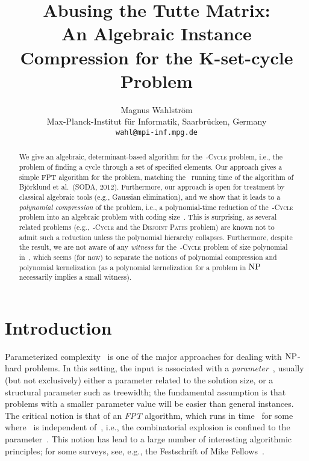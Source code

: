 \documentclass[a4paper,11pt]{article}
\title{Abusing the Tutte Matrix: \\An Algebraic Instance Compression for the K-set-cycle Problem}
\author{Magnus Wahlstr\"om\\
Max-Planck-Institut f\"ur Informatik,
Saarbr\"ucken, Germany \\
\texttt{wahl@mpi-inf.mpg.de}}
\newcommand{\cclass}[1]{\ensuremath{\mbox{\textup{#1}}}\xspace}
\newcommand{\NP}{\cclass{NP}}
\begin{document}
\maketitle

\begin{abstract}
We give an algebraic, determinant-based algorithm for the~\textsc{-Cycle} problem,
i.e., the problem of finding a cycle through a set of specified elements. Our approach
gives a simple FPT algorithm for the problem, matching the~ running time
of the algorithm of Bj\"orklund et al.~(SODA, 2012). Furthermore, our approach is open for
treatment by classical algebraic tools (e.g., Gaussian elimination), and we show that it
leads to a \emph{polynomial compression} of the problem, i.e., a polynomial-time reduction
of the~\textsc{-Cycle} problem into an algebraic problem with coding size~.
This is surprising, as several related problems (e.g.,~\textsc{-Cycle} and the
\textsc{Disjoint Paths} problem) are known not to admit such a reduction unless the
polynomial hierarchy collapses. Furthermore, despite the result, we are not aware of
any \emph{witness} for the~\textsc{-Cycle} problem of size polynomial in~,
which seems (for now) to separate the notions of polynomial compression and polynomial
kernelization (as a polynomial kernelization for a problem in \NP necessarily implies a
small witness). 
\end{abstract}

\section{Introduction}

Parameterized complexity~\cite{DowneyF98,FlumG06} is one of the major approaches for
dealing with \NP-hard problems. In this setting, the input is associated with a
\emph{parameter}~, usually (but not exclusively) either a parameter related to the
solution size, or a structural parameter such as treewidth; the fundamental assumption is that
problems with a smaller parameter value will be easier than general instances. 
The critical notion is that of an \emph{FPT} algorithm, which runs in time~
for some~ where~ is independent of~, i.e., the combinatorial explosion is
confined to the parameter~. This notion has lead to a large number of interesting
algorithmic principles; for some surveys, see, e.g., the Festschrift of Mike
Fellows~\cite{FellowsFestschrift}. 
\end{document}
